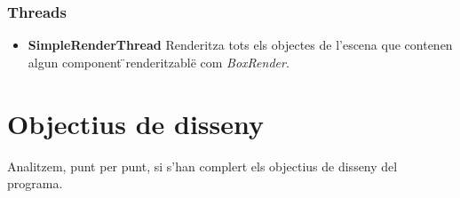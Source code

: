     \subsubsection{Threads}
    
      \begin{itemize}
        \item {\bf SimpleRenderThread}
          Renderitza tots els objectes de l'escena que contenen algun component \"{}renderitzable\"{} com {\em BoxRender}.
          
      \end{itemize}
      
\section{Objectius de disseny}

  Analitzem, punt per punt, si s'han complert els objectius de disseny del programa.

